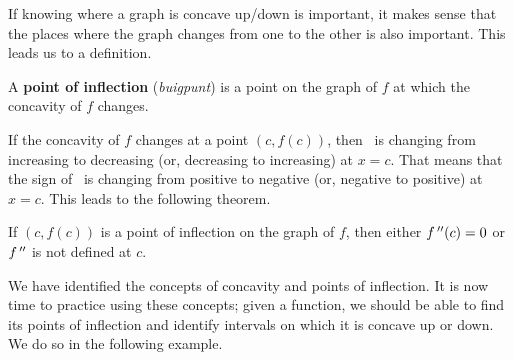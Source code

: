 If knowing where a graph is concave up/down is important, it makes sense that the places where the graph changes from one to the other is also important. This leads us to a definition.

\begin{definition}\label{def:infl}
A \textbf{point of inflection} (\textit{buigpunt}) is a point on the graph of $f$ at which the concavity of $f$ changes.
\end{definition}

If the concavity of $f$ changes at a point $(c,f(c))$, then \fp\ is changing from increasing to decreasing (or, decreasing to increasing) at $x=c$. That means that the sign of \fpp\ is changing from positive to negative (or, negative to positive) at $x=c$.  This leads to the following theorem.

\begin{theorem}\label{thm:inflection}
If $(c,f(c))$ is a point of inflection on the graph of $f$, then either $f\,''(c)=0$ or $f\,''$ is not defined at $c$.
\end{theorem}

We have identified the concepts of concavity and points of inflection. It is now time to practice using these concepts; given a function, we should be able to find its points of inflection and identify intervals on which it is concave up or down. We do so in the following example.

